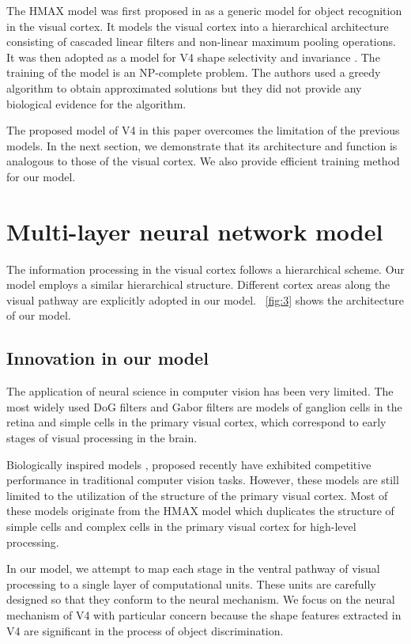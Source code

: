 \documentclass[10pt]{article}
\begin{document}
The HMAX model was first proposed in \cite{riesenhuber1999}
as a generic model for object recognition in the visual cortex.
It models the visual cortex into a hierarchical architecture 
consisting of cascaded linear filters and non-linear maximum pooling operations.
It was then adopted as a model for V4 shape selectivity and invariance \cite{cadieu2007}.
The training of the model is an NP-complete problem. 
The authors used a greedy algorithm to obtain approximated solutions
but they did not provide any biological evidence for the algorithm. 

The proposed model of V4 in this paper overcomes the limitation of the previous models.
In the next section, we demonstrate that its architecture and function is analogous 
to those of the visual cortex.
We also provide efficient training method for our model.

\section{Multi-layer neural network model}\label{sec:3}

The information processing in the visual cortex follows a hierarchical scheme.
Our model employs a similar hierarchical structure.
Different cortex areas along the visual pathway are explicitly adopted in our model. 
\figurename~\ref{fig:3} shows the architecture of our model.

\subsection{Innovation in our model}

The application of neural science in computer vision has been very limited.
The most widely used DoG filters and Gabor filters 
are models of ganglion cells in the retina and simple cells in the primary visual cortex, 
which correspond to early stages of visual processing in the brain.

Biologically inspired models \cite{serre2007, hong2011},
proposed recently have exhibited competitive performance in traditional computer vision tasks.
However, these models are still limited to the utilization 
of the structure of the primary visual cortex. 
Most of these models originate from the HMAX \cite{riesenhuber1999} model 
which duplicates the structure of simple cells and complex cells
in the primary visual cortex for high-level processing.

In our model, we attempt to map each stage in the ventral pathway of visual processing
to a single layer of computational units.
These units are carefully designed so that they conform to the neural mechanism.
We focus on the neural mechanism of V4 with particular concern
because the shape features extracted in V4 are significant in the process of object discrimination.
\end{document}
